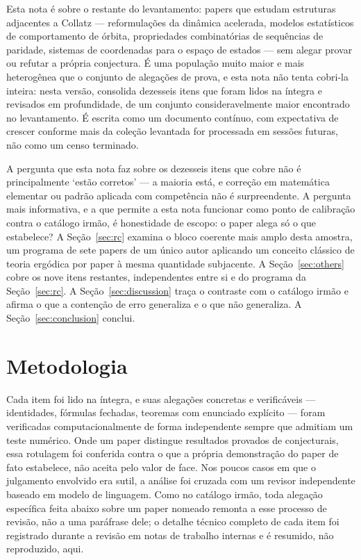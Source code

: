 \documentclass[11pt]{article}
\begin{document}
Esta nota é sobre o restante do levantamento: papers que estudam
estruturas adjacentes a Collatz --- reformulações da dinâmica
acelerada, modelos estatísticos de comportamento de órbita,
propriedades combinatórias de sequências de paridade, sistemas de
coordenadas para o espaço de estados --- sem alegar provar ou refutar a
própria conjectura. É uma população muito maior e mais heterogênea que
o conjunto de alegações de prova, e esta nota não tenta cobri-la
inteira: nesta versão, consolida dezesseis itens que foram lidos na
íntegra e revisados em profundidade, de um conjunto consideravelmente
maior encontrado no levantamento. É escrita como um documento contínuo,
com expectativa de crescer conforme mais da coleção levantada for
processada em sessões futuras, não como um censo terminado.

A pergunta que esta nota faz sobre os dezesseis itens que cobre não é
principalmente `estão corretos' --- a maioria está, e correção em
matemática elementar ou padrão aplicada com competência não é
surpreendente. A pergunta mais informativa, e a que permite a esta nota
funcionar como ponto de calibração contra o catálogo irmão, é
honestidade de escopo: o paper alega só o que estabelece? A
Seção~\ref{sec:rc} examina o bloco coerente mais amplo desta amostra,
um programa de sete papers de um único autor aplicando um conceito
clássico de teoria ergódica por paper à mesma quantidade subjacente. A
Seção~\ref{sec:others} cobre os nove itens restantes, independentes
entre si e do programa da Seção~\ref{sec:rc}. A Seção~\ref{sec:discussion}
traça o contraste com o catálogo irmão e afirma o que a contenção de
erro generaliza e o que não generaliza. A Seção~\ref{sec:conclusion}
conclui.

\section{Metodologia}
\label{sec:methodology}

Cada item foi lido na íntegra, e suas alegações concretas e
verificáveis --- identidades, fórmulas fechadas, teoremas com enunciado
explícito --- foram verificadas computacionalmente de forma
independente sempre que admitiam um teste numérico. Onde um paper
distingue resultados provados de conjecturais, essa rotulagem foi
conferida contra o que a própria demonstração do paper de fato
estabelece, não aceita pelo valor de face. Nos poucos casos em que o
julgamento envolvido era sutil, a análise foi cruzada com um revisor
independente baseado em modelo de linguagem. Como no catálogo irmão,
toda alegação específica feita abaixo sobre um paper nomeado remonta a
esse processo de revisão, não a uma paráfrase dele; o detalhe técnico
completo de cada item foi registrado durante a revisão em notas de
trabalho internas e é resumido, não reproduzido, aqui.
\end{document}
